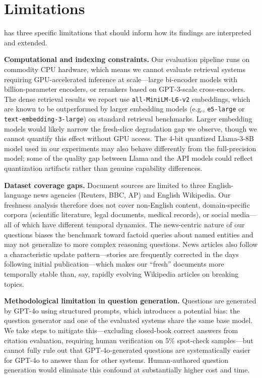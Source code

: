 \section{Limitations}
\label{sec:limitations}

\method{} has three specific limitations that should inform how its findings are interpreted and extended.

\textbf{Computational and indexing constraints.} Our evaluation pipeline runs on commodity CPU hardware, which means we cannot evaluate retrieval systems requiring GPU-accelerated inference at scale---large bi-encoder models with billion-parameter encoders, or rerankers based on GPT-3-scale cross-encoders. The dense retrieval results we report use \texttt{all-MiniLM-L6-v2} embeddings, which are known to be outperformed by larger embedding models (e.g., \texttt{e5-large} or \texttt{text-embedding-3-large}) on standard retrieval benchmarks. Larger embedding models would likely narrow the fresh-slice degradation gap we observe, though we cannot quantify this effect without GPU access. The 4-bit quantized Llama-3-8B model used in our experiments may also behave differently from the full-precision model; some of the quality gap between Llama and the API models could reflect quantization artifacts rather than genuine capability differences.

\textbf{Dataset coverage gaps.} Document sources are limited to three English-language news agencies (Reuters, BBC, AP) and English Wikipedia. Our freshness analysis therefore does not cover non-English content, domain-specific corpora (scientific literature, legal documents, medical records), or social media---all of which have different temporal dynamics. The news-centric nature of our questions biases the benchmark toward factoid queries about named entities and may not generalize to more complex reasoning questions. News articles also follow a characteristic update pattern---stories are frequently corrected in the days following initial publication---which makes our ``fresh'' documents more temporally stable than, say, rapidly evolving Wikipedia articles on breaking topics.

\textbf{Methodological limitation in question generation.} Questions are generated by GPT-4o using structured prompts, which introduces a potential bias: the question generator and one of the evaluated systems share the same base model. We take steps to mitigate this---excluding closed-book correct answers from citation evaluation, requiring human verification on 5\% spot-check samples---but cannot fully rule out that GPT-4o-generated questions are systematically easier for GPT-4o to answer than for other systems. Human-authored question generation would eliminate this confound at substantially higher cost and time.

